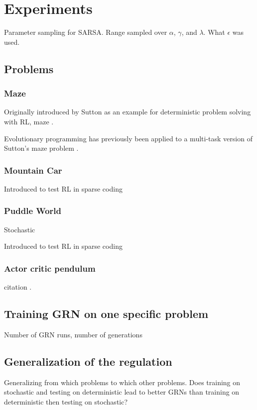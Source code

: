 \section{Experiments}

Parameter sampling for SARSA. Range sampled over $\alpha$, $\gamma$, and $\lambda$. What $\epsilon$ was used.

\subsection{Problems}

\subsubsection{Maze}

Originally introduced by Sutton as an example for deterministic problem solving with RL, maze \cite{Sutton1990}.

Evolutionary programming has previously been applied to a multi-task version of Sutton's maze problem \cite{Handa2007}.

\subsubsection{Mountain Car}

Introduced to test RL in sparse coding \cite{sutton1996generalization}

\subsubsection{Puddle World}

Stochastic

Introduced to test RL in sparse coding \cite{sutton1996generalization}

\subsubsection{Actor critic pendulum}

citation \cite{sutton1998introduction}. 

\subsection{Training GRN on one specific problem}

Number of GRN runs, number of generations

\subsection{Generalization of the regulation}

Generalizing from which problems to which other problems. Does training on stochastic and testing on deterministic lead to better GRNs than training on
deterministic then testing on stochastic?
